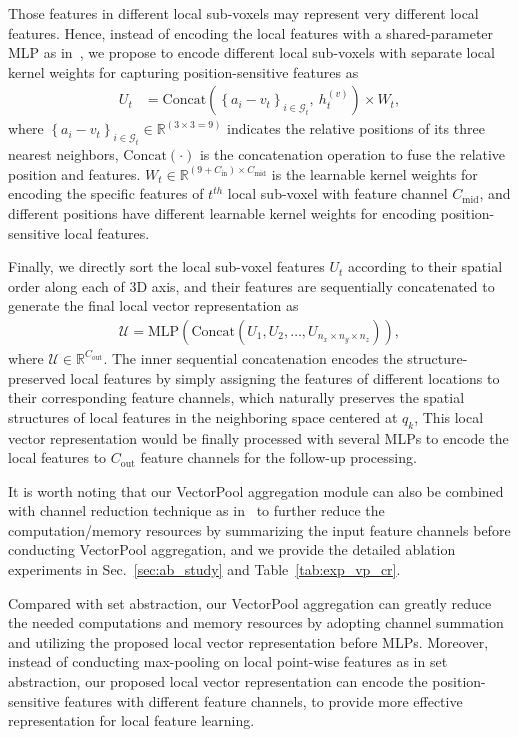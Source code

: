 \documentclass[natbib,twocolumn]{svjour3}          \smartqed  \usepackage{graphicx}
\begin{document}
Those features in different local sub-voxels may represent very different local features. 
Hence, instead of encoding the local features with a shared-parameter MLP as in~\citep{qi2017pointnet++}, we propose to encode different local sub-voxels with separate local kernel weights for capturing position-sensitive features as 
\begin{align}\label{eq:pos_encoding}
	U_t &= \text{Concat}\left(\left\{a_i-v_t\right\}_{i\in \mathcal{G}_t},~ h^{(v)}_{t} \right)\times W_t, 
\end{align}
where $\left\{a_i-v_t\right\}_{i\in \mathcal{G}_t}\in \mathbb{R}^{(3\times 3=9)}$ indicates the relative positions of its three nearest neighbors, $\text{Concat}(\cdot)$ is the concatenation operation to fuse the relative position and features. 
$W_t \in \mathbb{R}^{(9+C_{\text{in}}) \times C_{\text{mid}}}$  is the learnable kernel weights for encoding the specific features of $t^{th}$ local sub-voxel with feature channel $C_{\text{mid}}$, and different positions have different learnable kernel weights for encoding position-sensitive local features.

Finally, we directly sort the local sub-voxel features $U_t$ according to their spatial order along each of 3D axis, and their features are sequentially concatenated to generate the final local vector representation as
\begin{align}
	\mathcal{U}=\text{MLP}\left(\text{Concat} \left(U_1, U_2, \dots, U_{n_x\times n_y\times  n_z}\right)\right),
\end{align}
where $\mathcal{U} \in \mathbb{R}^{C_{\text{out}}}$. The inner sequential concatenation encodes the structure-preserved local features by simply assigning the features of different locations to their corresponding feature channels, which naturally preserves the spatial structures of local features in the neighboring space centered at $q_k$, 
This local vector representation would be finally processed with several MLPs to encode the local features to $C_{\text{out}}$ feature channels for the follow-up processing. 


It is worth noting that our VectorPool aggregation module can also be combined with channel reduction technique as in~\citep{sun2018fishnet} to further reduce the computation/memory resources by summarizing the input feature channels before conducting VectorPool aggregation, and we provide the detailed ablation experiments in Sec.~\ref{sec:ab_study} and Table~\ref{tab:exp_vp_cr}.


Compared with set abstraction, our VectorPool aggregation can greatly reduce the needed computations and memory resources by adopting channel summation and utilizing the proposed local vector representation before MLPs. 
Moreover, instead of conducting max-pooling on local point-wise features as in set abstraction, 
our proposed local vector representation can encode the position-sensitive features with different feature channels, to provide more effective representation for local feature learning.  
\end{document}
